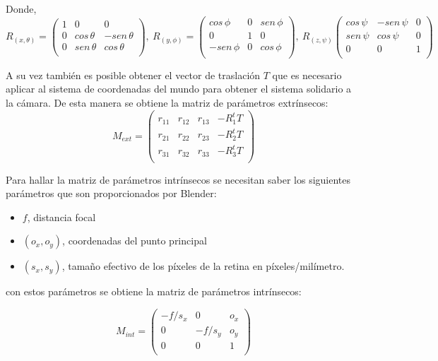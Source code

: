  Donde,
 \[R_{(x,\theta)} = \begin{pmatrix}
		1 &   0         &  0\\
		0 & cos\,\theta & -sen\,\theta\\
		0 & sen\,\theta & cos\,\theta\\ 
\end{pmatrix}, ~
R_{(y,\phi)}=\begin{pmatrix}
		cos\,\phi  & 0 & sen\,\phi\\
		0          & 1 & 0\\
		-sen\,\phi &0  & cos\,\phi\\ 
\end{pmatrix}, ~
R_{(z,\psi)}\begin{pmatrix}
		cos\,\psi & -sen\,\psi & 0\\
		sen\,\psi & cos\,\psi  & 0\\
		 0          & 0            & 1\\ 
\end{pmatrix}\]

A su vez también es posible obtener el vector de traslación $T$ que es necesario aplicar al sistema de coordenadas del mundo para obtener el sistema solidario a la cámara. De esta manera se obtiene la matriz de parámetros extrínsecos:
\[
		M_{ext}=\begin{pmatrix}
			r_{11} & r_{12} & r_{13} &-R^t_1 T\\
			r_{21} & r_{22} & r_{23} &-R^t_2 T\\
			r_{31} & r_{32} & r_{33} &-R^t_3 T\\
		\end{pmatrix}
\] 

Para hallar la matriz de parámetros intrínsecos se necesitan saber los siguientes parámetros que son proporcionados por Blender: 
\begin{itemize}
\item $f$, distancia focal
\item $(o_x, o_y)$, coordenadas del punto principal
\item $(s_x,s_y)$, tamaño efectivo de los píxeles de la retina en píxeles/milímetro.
\end{itemize}

con estos parámetros se obtiene la matriz de parámetros intrínsecos:

\[M_{int}=\begin{pmatrix}
			-f/s_x & 0      & o_x\\
			0      & -f/s_y & o_y\\
			0      & 0      & 1\\
		\end{pmatrix} \]
 
